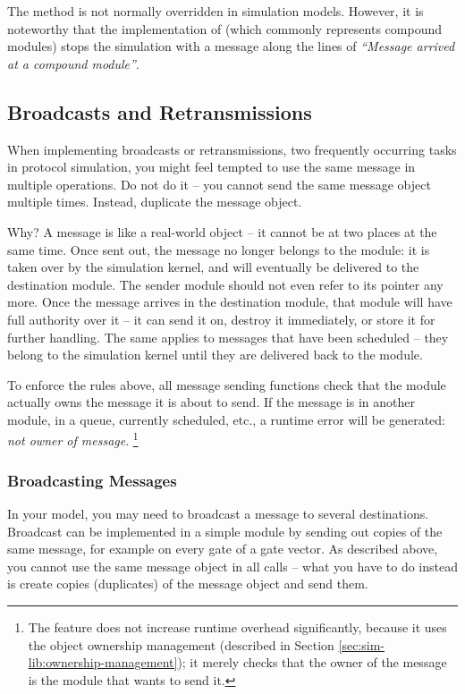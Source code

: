 \begin{ned}
The  method is not normally overridden in simulation models.
However, it is noteworthy that the  implementation of
 (which commonly represents compound modules) stops the
simulation with a message along the lines of \textit{``Message arrived at a compound
module''}.


\subsection{Broadcasts and Retransmissions}
\label{sec:simple-modules:broadcasts-and-retransmissions}

When implementing broadcasts or retransmissions, two frequently
occurring tasks in protocol simulation, you might feel tempted
to use the same message in multiple  operations.
Do not do it -- you cannot send the same message object multiple times.
Instead, duplicate the message object.

Why? A message is like a real-world object -- it cannot be at two places
at the same time. Once sent out, the message no longer belongs
to the module: it is taken over by the simulation kernel, and will
eventually be delivered to the destination module. The sender module should
not even refer to its pointer any more. Once the message arrives in the
destination module, that module will have full authority over it -- it can
send it on, destroy it immediately, or store it for further handling. The
same applies to messages that have been scheduled -- they belong to the
simulation kernel until they are delivered back to the module.

To enforce the rules above, all message sending functions check that the
module actually owns the message it is about to send. If the message is in
another module, in a queue, currently scheduled, etc., a runtime error
will be generated: \textit{not owner of message}.
  \footnote{The feature does not increase runtime overhead significantly, because
  it uses the object ownership management (described in
  Section \ref{sec:sim-lib:ownership-management});
  it merely checks that the owner of the message is the module that
  wants to send it.}


\subsubsection{Broadcasting Messages}
\label{sec:simple-modules:broadcasting-messages}

In your model, you may need to broadcast a message to several destinations.
Broadcast can be implemented in a simple module by sending out copies
of the same message, for example on every gate of a gate vector.
As described above, you cannot use the same message object in all
 calls -- what you have to do instead is
create copies (duplicates) of the message object and send them.


\end{ned}
